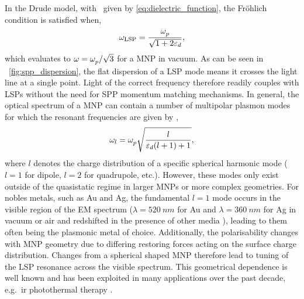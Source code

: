 \documentclass{article}
\begin{document}
In the Drude model, with \dielectric\ given by \eqref{eq:dielectric_function}, the Fr\"{o}hlich condition is satisfied when,
\begin{equation}
	\omega_{\mathrm{LSP}} = \frac{\omega_{p}^{}}{\sqrt{1+2\varepsilon_d}},
\end{equation}
which evaluates to $\omega = \omega_{p}^{}/\sqrt{3}$ for a MNP in vacuum. As can be seen in \figurename~\ref{fig:spp_dispersion}, the flat dispersion of a LSP mode means it crosses the light line at a single point. Light of the correct frequency therefore readily couples with LSPs without the need for SPP momentum matching mechanisms.
In general, the optical spectrum of a MNP can contain a number of multipolar plasmon modes for which the resonant frequencies are given by \cite{prodan2004},
\begin{equation}
	\omega_l = \omega_{p}^{}\sqrt{\frac{l}{\varepsilon_d(l+1)+1}},
\end{equation}
where $l$ denotes the charge distribution of a specific spherical harmonic mode ($l=1$ for dipole, $l=2$ for quadrupole, etc.). However, these modes only exist outside of the quasistatic regime in larger MNPs or more complex geometries.
For nobles metals, such as Au and Ag, the fundamental $l=1$ mode occurs in the visible region of the EM spectrum ($\lambda=\SI{520}{nm}$ for Au and $\lambda=\SI{360}{nm}$ for Ag in vacuum or air \cite{maier2007plasmonics} and redshifted in the presence of other media \cite{sonnichsen2000}), leading to them often being the plasmonic metal of choice.
Additionally, the polarisability changes with MNP geometry due to differing restoring forces acting on the surface charge distribution. Changes from a spherical shaped MNP therefore lead to tuning of the LSP resonance across the visible spectrum. This geometrical dependence is well known \cite{krenn2000, mock2002, kuwata2003} and has been exploited in many applications over the past decade, e.g.\ \gls{ir} photothermal therapy \cite{huang2006, huang2008, huang2010gold}.
\end{document}

